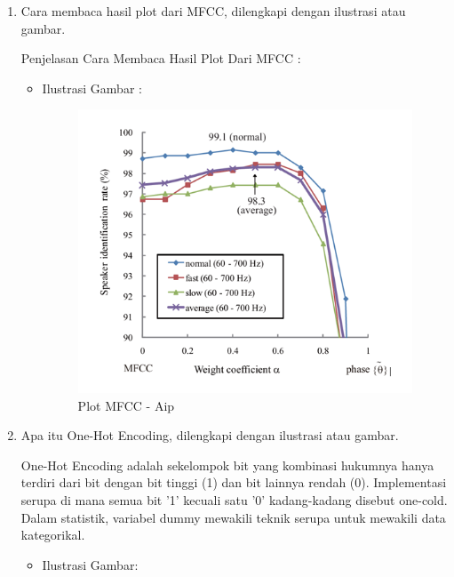 \begin{enumerate}
\begin{itemize}
\begin{itemize}
\end{itemize}
\end{itemize}

\item Cara membaca hasil plot dari MFCC, dilengkapi dengan ilustrasi atau gambar.

Penjelasan Cara Membaca Hasil Plot Dari MFCC :
\begin{itemize}
\item Ilustrasi Gambar :
\begin{figure}[ht]
\centering
\includegraphics[scale=0.4]{figures/AIP/f5.PNG}
\caption{Plot MFCC - Aip}
\label{Plot MFCC - Aip}
\end{figure}

\end{itemize}

\item Apa itu One-Hot Encoding, dilengkapi dengan ilustrasi atau gambar.


One-Hot Encoding adalah sekelompok bit yang kombinasi hukumnya hanya terdiri dari bit dengan bit tinggi (1) dan bit lainnya rendah (0). Implementasi serupa di mana semua bit '1' kecuali satu '0' kadang-kadang disebut one-cold. Dalam statistik, variabel dummy mewakili teknik serupa untuk mewakili data kategorikal.
\begin{itemize}
\item Ilustrasi Gambar:


\end{itemize}
\end{enumerate}

